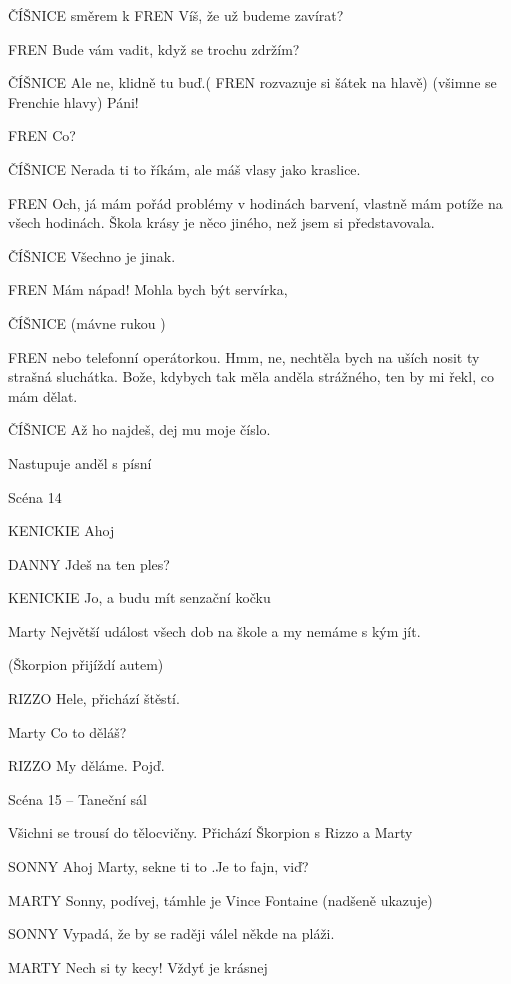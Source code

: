 ČÍŠNICE          směrem k FREN  Víš, že už budeme zavírat? 

FREN        Bude vám vadit, když se trochu zdržím?

ČÍŠNICE         Ale ne, klidně tu buď.( FREN rozvazuje si šátek na hlavě) (všimne se         Frenchie hlavy) Páni! 

FREN        Co? 

ČÍŠNICE        Nerada ti to říkám, ale máš vlasy jako kraslice. 

FREN        Och, já mám pořád problémy v hodinách barvení, vlastně mám potíže         na všech hodinách. Škola krásy je něco jiného, než jsem si                         představovala. 

ČÍŠNICE         Všechno je jinak.

FREN        Mám nápad! Mohla bych být servírka,

ČÍŠNICE        (mávne rukou ) 

FREN        nebo telefonní operátorkou. Hmm, ne, nechtěla bych na uších nosit ty         strašná sluchátka. Bože, kdybych tak měla anděla strážného, ten by mi         řekl, co mám dělat. 

ČÍŠNICE         Až ho najdeš, dej mu moje číslo. 

Nastupuje anděl s písní 

Scéna 14 

KENICKIE                 Ahoj

DANNY        Jdeš na ten ples?

KENICKIE        Jo, a budu mít senzační kočku

Marty        Největší událost všech dob na škole a my nemáme s kým jít.

(Škorpion přijíždí autem)

RIZZO        Hele, přichází štěstí.

Marty        Co to děláš?

RIZZO        My děláme. Pojď.

Scéna 15 – Taneční sál 

Všichni se trousí do tělocvičny. Přichází Škorpion s Rizzo a Marty

SONNY        Ahoj Marty, sekne ti to .Je to fajn, viď? 

MARTY        Sonny, podívej, támhle je Vince Fontaine (nadšeně ukazuje) 

SONNY        Vypadá, že by se raději válel někde na pláži. 

MARTY        Nech si ty kecy! Vždyť je krásnej 

